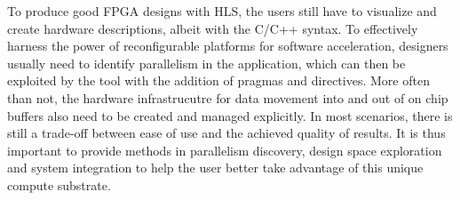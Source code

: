 To produce good FPGA designs with HLS, 
the users still have to visualize and create hardware descriptions,
albeit with the C/C++ syntax.
To effectively harness the power of reconfigurable platforms for software acceleration, designers usually need to identify parallelism
in the application, which can then be exploited by the tool with the addition of pragmas and directives. 
More often than not, the hardware infrastrucutre for data movement into and out of on chip buffers also need to be created and managed explicitly.
In most scenarios, there is still a trade-off between ease of use and the achieved quality of results. 
It is thus important to provide methods in parallelism discovery, design space exploration and system integration
to help the user better take advantage of this unique compute substrate.

